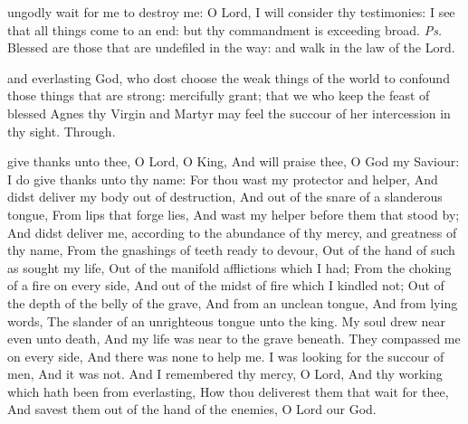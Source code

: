 \introit
{} ungodly wait for me to destroy me: O Lord, I will consider thy testimonies: I see that all things come to an end: but thy commandment is exceeding broad. \textit{Ps.} Blessed are those that are undefiled in the way: and walk in the law of the Lord.

\collect
{} and everlasting God, who dost choose the weak things of the world to confound those things that are strong: mercifully grant; that we who keep the feast of blessed Agnes thy Virgin and Martyr may feel the succour of her intercession in thy sight. Through.

 give thanks unto thee, O Lord, O King, And will praise thee, O God my Saviour: I do give thanks unto thy name: For thou wast my protector and helper, And didst deliver my body out of destruction, And out of the snare of a slanderous tongue, From lips that forge lies, And wast my helper before them that stood by; And didst deliver me, according to the abundance of thy mercy, and greatness of thy name, From the gnashings of teeth ready to devour, Out of the hand of such as sought my life, Out of the manifold afflictions which I had; From the choking of a fire on every side, And out of the midst of fire which I kindled not; Out of the depth of the belly of the grave, And from an unclean tongue, And from lying words, The slander of an unrighteous tongue unto the king. My soul drew near even unto death, And my life was near to the grave beneath. They compassed me on every side, And there was none to help me. I was looking for the succour of men, And it was not. And I remembered thy mercy, O Lord, And thy working which hath been from everlasting, How thou deliverest them that wait for thee, And savest them out of the hand of the enemies, O Lord our God.



